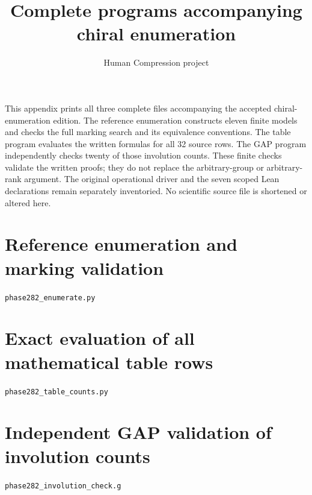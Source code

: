 \documentclass[11pt,a4paper]{article}
\title{Complete programs accompanying chiral enumeration}
\author{Human Compression project}\date{}
\begin{document}
\maketitle
This appendix prints all three complete files accompanying the accepted chiral-enumeration edition. The reference enumeration constructs eleven finite models and checks the full marking search and its equivalence conventions. The table program evaluates the written formulas for all 32 source rows. The GAP program independently checks twenty of those involution counts. These finite checks validate the written proofs; they do not replace the arbitrary-group or arbitrary-rank argument. The original operational driver and the seven scoped Lean declarations remain separately inventoried. No scientific source file is shortened or altered here.
\section*{Reference enumeration and marking validation}
\texttt{phase282\_enumerate.py}
\section*{Exact evaluation of all mathematical table rows}
\texttt{phase282\_table\_counts.py}
\section*{Independent GAP validation of involution counts}
\texttt{phase282\_involution\_check.g}
\end{document}
